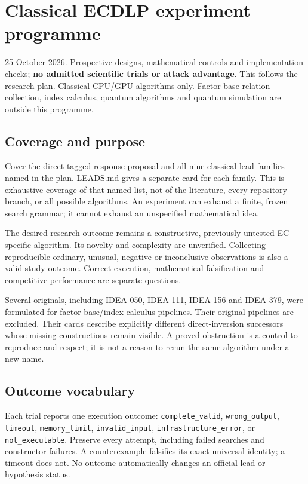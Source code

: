 \documentclass[
  10pt,
]{article}
\author{}
\date{}
\begin{document}
\section{Classical ECDLP experiment
programme}\label{classical-ecdlp-experiment-programme}

25 October 2026. Prospective designs, mathematical controls and
implementation checks; \textbf{no admitted scientific trials or attack
advantage}. This follows \href{../PLAN.md}{the research plan}. Classical
CPU/GPU algorithms only. Factor-base relation collection, index
calculus, quantum algorithms and quantum simulation are outside this
programme.

\subsection{Coverage and purpose}\label{coverage-and-purpose}

Cover the direct tagged-response proposal and all nine classical lead
families named in the plan. \url{LEADS.md} gives a separate card for
each family. This is exhaustive coverage of that named list, not of the
literature, every repository branch, or all possible algorithms. An
experiment can exhaust a finite, frozen search grammar; it cannot
exhaust an unspecified mathematical idea.

The desired research outcome remains a constructive, previously untested
EC-specific algorithm. Its novelty and complexity are unverified.
Collecting reproducible ordinary, unusual, negative or inconclusive
observations is also a valid study outcome. Correct execution,
mathematical falsification and competitive performance are separate
questions.

Several originals, including IDEA-050, IDEA-111, IDEA-156 and IDEA-379,
were formulated for factor-base/index-calculus pipelines. Their original
pipelines are excluded. Their cards describe explicitly different
direct-inversion successors whose missing constructions remain visible.
A proved obstruction is a control to reproduce and respect; it is not a
reason to rerun the same algorithm under a new name.

\subsection{Outcome vocabulary}\label{outcome-vocabulary}

Each trial reports one execution outcome: \texttt{complete\_valid},
\texttt{wrong\_output}, \texttt{timeout}, \texttt{memory\_limit},
\texttt{invalid\_input}, \texttt{infrastructure\_error}, or
\texttt{not\_executable}. Preserve every attempt, including failed
searches and constructor failures. A counterexample falsifies its exact
universal identity; a timeout does not. No outcome automatically changes
an official lead or hypothesis status.
\end{document}
